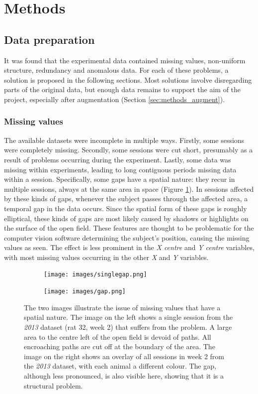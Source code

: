 \documentclass[conference,a4paper,twoside]{IEEEtran}
\begin{document}
\section{Methods}
\label{sec:methods}

\subsection{Data preparation}
\label{sec:methods_dataprep}
It was found that the experimental data contained missing values, non-uniform structure, redundancy and anomalous data. For each of these problems, a solution is proposed in the following sections. Most solutions involve disregarding parts of the original data, but enough data remains to support the aim of the project, especially after augmentation (Section \ref{sec:methods_augment}).

\subsubsection{Missing values}
\label{sec:methods_dataprep_missing}
The available datasets were incomplete in multiple ways. Firstly, some sessions were completely missing. Secondly, some sessions were cut short, presumably as a result of problems occurring during the experiment. Lastly, some data was missing within experiments, leading to long contiguous periods missing data within a session. Specifically, some gaps have a spatial nature: they recur in multiple sessions, always at the same area in space (Figure \ref{fig:gap}). In sessions affected by these kinds of gaps, whenever the subject passes through the affected area, a temporal gap in the data occurs. Since the spatial form of these gaps is roughly elliptical, these kinds of gaps are most likely caused by shadows or highlights on the surface of the open field. These features are thought to be problematic for the computer vision software determining the subject's position, causing the missing values as seen. The effect is less prominent in the \emph{X centre} and \emph{Y centre} variables, with most missing values occurring in the other \emph{X} and \emph{Y} variables.

\begin{figure}
    \centering
    \begin{subfigure}{}
        \texttt{[image: images/singlegap.png]}
    \end{subfigure}
    \begin{subfigure}{}
        \texttt{[image: images/gap.png]}
    \end{subfigure}
    \caption{The two images illustrate the issue of missing values that have a spatial nature. The image on the left shows a single session from the \emph{2013} dataset (rat 32, week 2) that suffers from the problem. A large area to the centre left of the open field is devoid of paths. All encroaching paths are cut off at the boundary of the area. The image on the right shows an overlay of all sessions in week 2 from the \emph{2013} dataset, with each animal a different colour. The gap, although less pronounced, is also visible here, showing that it is a structural problem.}
    \label{fig:gap}
\end{figure}
\end{document}
